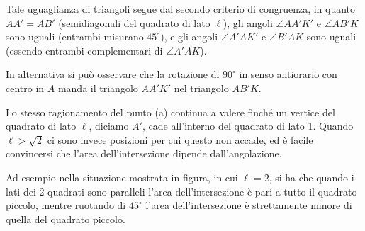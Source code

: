 {Tale uguaglianza di triangoli segue dal secondo criterio di congruenza, in quanto $AA'=AB'$ (semidiagonali del quadrato di lato $\ell$), gli angoli $\angle AA'K'$ e $\angle AB'K$ sono uguali
(entrambi misurano $45^{\circ}$), e gli angoli $\angle A'AK'$ e $\angle
B'AK$ sono uguali (essendo entrambi complementari di $\angle A'AK$).

In alternativa si può osservare che la rotazione di $90^{\circ}$ in senso antiorario con centro in $A$ manda il triangolo $AA'K'$ nel triangolo $AB'K$.


\DomandaB Lo stesso ragionamento del punto (a) continua a valere
finché un vertice del quadrato di lato $\ell$, diciamo $A'$, cade all'interno del quadrato di lato 1.  Quando $\ell>\sqrt{2}$ ci sono invece posizioni per cui questo non accade, ed è facile convincersi che l'area dell'intersezione dipende dall'angolazione.

Ad esempio nella situazione mostrata in figura, in cui $\ell=2$, si ha che quando i lati dei 2 quadrati sono paralleli l'area dell'intersezione è pari a tutto il quadrato piccolo, mentre ruotando di $45^{\circ}$ l'area dell'intersezione è strettamente minore di quella del quadrato piccolo.

}
